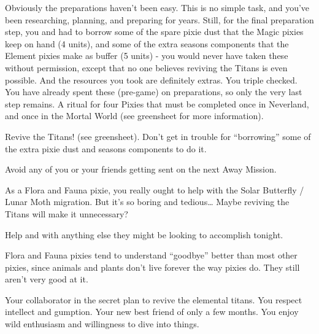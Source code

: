 \documentclass[char]{PP}
\begin{document}
 Obviously the preparations haven’t been easy. This is no simple task, and you’ve been researching, planning, and preparing for years. Still, for the final preparation step, you and \cETitan{} had to borrow some of the spare pixie dust that the Magic pixies keep on hand (4 units), and some of the extra seasons components that the Element pixies make as buffer (5 units) - you would never have taken these without permission, except that no one believes reviving the Titans is even possible. And the resources you took are definitely extras. You triple checked. You have already spent these (pre-game) on preparations, so only the very last step remains. A ritual for four Pixies that must be completed once in Neverland, and once in the Mortal World (see greensheet for more information).


\begin{itemz}
	\item Revive the Titans! (see greensheet). Don’t get in trouble for “borrowing” some of the extra pixie dust and seasons components to do it.
	\item Avoid any of you or your friends getting sent on the next Away Mission.
	\item As a Flora and Fauna pixie, you really ought to help with the Solar Butterfly / Lunar Moth migration. But it’s so boring and tedious… Maybe reviving the Titans will make it unnecessary?
	\item Help \cETitan{} and \cEAirship{} with anything else they might be looking to accomplish tonight.
\end{itemz}

\begin{itemz}[Notes]
	\item Flora and Fauna pixies tend to understand ``goodbye'' better than most other pixies, since animals and plants don’t live forever the way pixies do. They still aren't very good at it.
\end{itemz}

\begin{contacts}
	\contact{\cETitan{}} Your collaborator in the secret plan to revive the elemental titans. You respect \cETitan{\their} intellect and gumption.
	\contact{\cEAirship{}} Your new best friend of only a few months. You enjoy \cEAirship{\their} wild enthusiasm and willingness to dive into things.
\end{contacts}
\end{document}
